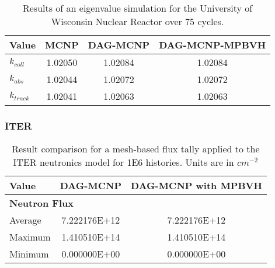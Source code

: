   
  \begin{table}[H]
    \small
    \begin{center}
      \begin{tabular}{lccc}
        \toprule
        Value     & MCNP    & DAG-MCNP & DAG-MCNP-MPBVH \\
        \toprule
        $k_{coll}$  & 1.02050 & 1.02084  & 1.02084        \\
        $k_{abs}$   & 1.02044 & 1.02072  & 1.02072        \\
        $k_{track}$ & 1.02041 & 1.02063  & 1.02063        \\
        \bottomrule
      \end{tabular}
    \end{center}
    \caption[Results of eigenvalue simulations in UWNR for various DAG-MCNP
      implementations.]{Results of an eigenvalue simulation for the University
      of Wisconsin Nuclear Reactor over 75 cycles.}
  \end{table}


  \subsubsection{ITER}

  \begin{table}[H]
    \small
    \begin{center}
      \begin{tabular}{lcc}
        \toprule
        Value   & DAG-MCNP     & DAG-MCNP with MPBVH      \\
        \toprule
        \multicolumn{3}{l}{\textbf{Neutron Flux}} \\
        Average & 7.222176E+12 & 7.222176E+12     \\
        Maximum & 1.410510E+14 & 1.410510E+14     \\
        Minimum & 0.000000E+00 & 0.000000E+00     \\       
        \bottomrule
      \end{tabular}
    \end{center}
    \caption[Flux tally results in the ITER model for various DAG-MCNP
      implementations.]{Result comparison for a mesh-based flux tally applied to
      the ITER neutronics model for \num{1E6} histories. Units are in $cm^{-2}$}
  \end{table}
  


